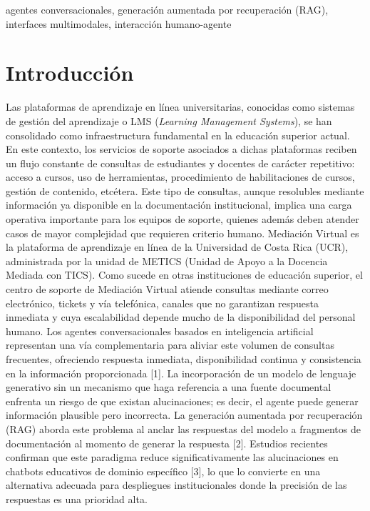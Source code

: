 \documentclass[conference]{IEEEtran}
\begin{document}
\begin{IEEEkeywords}
agentes conversacionales, generación aumentada por recuperación (RAG), interfaces multimodales, interacción humano-agente
\end{IEEEkeywords}

\section{Introducción}
Las plataformas de aprendizaje en línea universitarias, conocidas como sistemas de gestión del aprendizaje o LMS (\emph{Learning Management Systems}), se han consolidado como infraestructura fundamental en la educación superior actual. En este contexto, los servicios de soporte asociados a dichas plataformas reciben un flujo constante de consultas de estudiantes y docentes de carácter repetitivo: acceso a cursos, uso de herramientas, procedimiento de habilitaciones de cursos, gestión de contenido, etcétera. Este tipo de consultas, aunque resolubles mediante información ya disponible en la documentación institucional, implica una carga operativa importante para los equipos de soporte, quienes además deben atender casos de mayor complejidad que requieren criterio humano.
Mediación Virtual es la plataforma de aprendizaje en línea de la Universidad de Costa Rica (UCR), administrada por la unidad de METICS (Unidad de Apoyo a la Docencia Mediada con TICS). Como sucede en otras instituciones de educación superior, el centro de soporte de Mediación Virtual atiende consultas mediante correo electrónico, tickets y vía telefónica, canales que no garantizan respuesta inmediata y cuya escalabilidad depende mucho de la disponibilidad del personal humano. Los agentes conversacionales basados en inteligencia artificial representan una vía complementaria para aliviar este volumen de consultas frecuentes, ofreciendo respuesta inmediata, disponibilidad continua y consistencia en la información proporcionada [1]. 
La incorporación de un modelo de lenguaje generativo sin un mecanismo que haga referencia a una fuente documental enfrenta un riesgo de que existan alucinaciones; es decir, el agente puede generar información plausible pero incorrecta. La generación aumentada por recuperación (RAG) aborda este problema al anclar las respuestas del modelo a fragmentos de documentación al momento de generar la respuesta [2]. Estudios recientes confirman que este paradigma reduce significativamente las alucinaciones en chatbots educativos de dominio específico [3], lo que lo convierte en una alternativa adecuada para despliegues institucionales donde la precisión de las respuestas es una prioridad alta.
\end{document}
